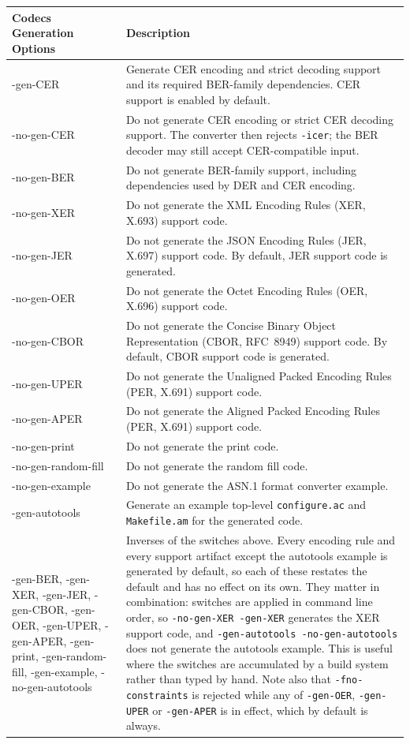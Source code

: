 \documentclass[english,oneside,12pt]{book}
\begin{document}
\begin{longtable}{lp{4in}}
\textbf{Codecs Generation Options} & \textbf{Description}\\
\midrule
{\ttfamily -gen-CER} & {\small Generate CER encoding and strict decoding support and its required BER-family
dependencies. CER support is enabled by default.}\\
{\ttfamily -no-gen-CER} & {\small Do not generate CER encoding or strict CER decoding support.
The converter then rejects \texttt{-icer}; the BER decoder may still accept CER-compatible input.}\\
{\ttfamily -no-gen-BER} & {\small Do not generate BER-family support, including dependencies used
by DER and CER encoding.}\\
{\ttfamily -no-gen-XER} & {\small Do not generate the XML Encoding Rules (XER, X.693) support code.}\\
{\ttfamily -no-gen-JER} & {\small Do not generate the JSON Encoding Rules (JER, X.697) support code. By default, JER support code is generated.}\\
{\ttfamily -no-gen-OER} & {\small Do not generate the Octet Encoding Rules (OER, X.696) support code.}\\
{\ttfamily -no-gen-CBOR} & {\small Do not generate the Concise Binary Object Representation (CBOR, RFC~8949) support code. By default, CBOR support code is generated.}\\
{\ttfamily -no-gen-UPER} & {\small Do not generate the Unaligned Packed Encoding Rules (PER, X.691) support code.}\\
{\ttfamily -no-gen-APER} & {\small Do not generate the Aligned Packed Encoding Rules (PER, X.691) support code.}\\
{\ttfamily -no-gen-print} & {\small Do not generate the print code.}\\
{\ttfamily -no-gen-random-fill} & {\small Do not generate the random fill code.}\\
{\ttfamily -no-gen-example} & {\small Do not generate the ASN.1 format converter example.}\\
{\ttfamily -gen-autotools} & {\small Generate an example top-level \texttt{configure.ac} and \texttt{Makefile.am} for the generated code.}\\
{\ttfamily -gen-BER}, {\ttfamily -gen-XER}, {\ttfamily -gen-JER}, {\ttfamily -gen-CBOR}, {\ttfamily -gen-OER}, {\ttfamily -gen-UPER}, {\ttfamily -gen-APER}, {\ttfamily -gen-print}, {\ttfamily -gen-random-fill}, {\ttfamily -gen-example}, {\ttfamily -no-gen-autotools} & {\small Inverses of the switches above. Every encoding rule and every support artifact except the autotools example is generated by default, so each of these restates the default and has no effect on its own. They matter in combination: switches are applied in command line order, so \texttt{-no-gen-XER -gen-XER} generates the XER support code, and \texttt{-gen-autotools -no-gen-autotools} does not generate the autotools example. This is useful where the switches are accumulated by a build system rather than typed by hand. Note also that \texttt{-fno-constraints} is rejected while any of \texttt{-gen-OER}, \texttt{-gen-UPER} or \texttt{-gen-APER} is in effect, which by default is always.}\\

\end{longtable}
\end{document}
